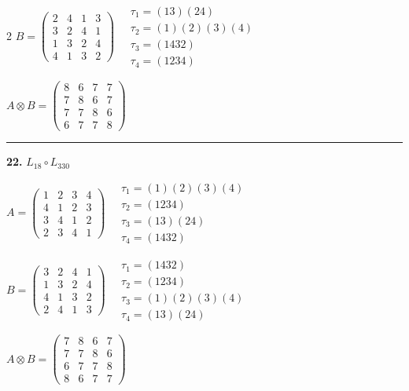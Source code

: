 \begin{multicols}{2}
$B = \begin{pmatrix} 2 & 4 & 1 & 3 \\ 3 & 2 & 4 & 1 \\ 1 & 3 & 2 & 4 \\ 4 & 1 & 3 & 2 \end{pmatrix} \quad \begin{matrix} \tau_{1}=(1 3)(2 4) \\ \tau_{2}=(1)(2)(3)(4) \\ \tau_{3}=(1 4 3 2) \\ \tau_{4}=(1 2 3 4) \end{matrix}$

$A \otimes B = \begin{pmatrix} 8 & 6 & 7 & 7 \\ 7 & 8 & 6 & 7 \\ 7 & 7 & 8 & 6 \\ 6 & 7 & 7 & 8 \end{pmatrix}$

\vspace{0.3em}
\hrule
\vspace{0.3em}

\noindent\textbf{22.} $L_{18} \circ L_{330}$

$A = \begin{pmatrix} 1 & 2 & 3 & 4 \\ 4 & 1 & 2 & 3 \\ 3 & 4 & 1 & 2 \\ 2 & 3 & 4 & 1 \end{pmatrix} \quad \begin{matrix} \tau_{1}=(1)(2)(3)(4) \\ \tau_{2}=(1 2 3 4) \\ \tau_{3}=(1 3)(2 4) \\ \tau_{4}=(1 4 3 2) \end{matrix}$

$B = \begin{pmatrix} 3 & 2 & 4 & 1 \\ 1 & 3 & 2 & 4 \\ 4 & 1 & 3 & 2 \\ 2 & 4 & 1 & 3 \end{pmatrix} \quad \begin{matrix} \tau_{1}=(1 4 3 2) \\ \tau_{2}=(1 2 3 4) \\ \tau_{3}=(1)(2)(3)(4) \\ \tau_{4}=(1 3)(2 4) \end{matrix}$

$A \otimes B = \begin{pmatrix} 7 & 8 & 6 & 7 \\ 7 & 7 & 8 & 6 \\ 6 & 7 & 7 & 8 \\ 8 & 6 & 7 & 7 \end{pmatrix}$


\end{multicols}

